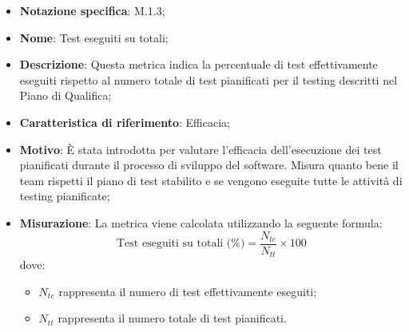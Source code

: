 \begin{itemize}
    \item \textbf{Notazione specifica}: M.1.3;
    \item \textbf{Nome}: Test eseguiti su totali;
    \item \textbf{Descrizione}: Questa metrica indica la percentuale di test effettivamente eseguiti rispetto al numero totale di test pianificati per il testing descritti nel Piano di Qualifica;
    \item \textbf{Caratteristica di riferimento}: Efficacia;
    \item \textbf{Motivo}: È stata introdotta per valutare l'efficacia dell'esecuzione dei test pianificati durante il processo di sviluppo del software. Misura quanto bene il team rispetti il piano di test stabilito e se vengono eseguite tutte le attività di testing pianificate;
    \item \textbf{Misurazione}: La metrica viene calcolata utilizzando la seguente formula:
    \[
    \text{Test eseguiti su totali (\%)} = \frac{N_{te}}{N_{tt}} \times 100
    \]
    dove:
    \begin{itemize}
        \item $N_{te}$ rappresenta il numero di test effettivamente eseguiti;
        \item $N_{tt}$ rappresenta il numero totale di test pianificati.
    \end{itemize}
   
\end{itemize}
